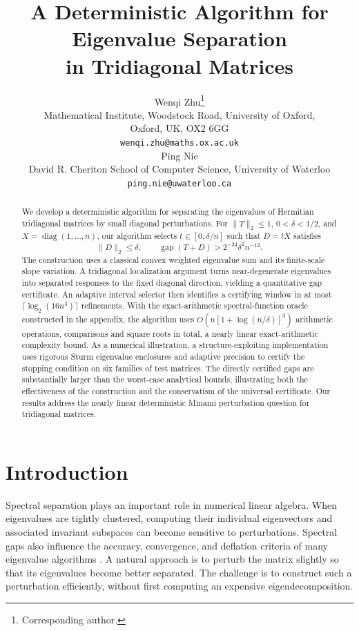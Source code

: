 \documentclass[10pt,a4paper]{article}
\title{A Deterministic Algorithm for Eigenvalue Separation\\in Tridiagonal Matrices}
\author{%
Wenqi Zhu\thanks{Corresponding author.}\\
{\small Mathematical Institute, Woodstock Road, University of Oxford,}\\
{\small Oxford, UK, OX2 6GG}\\
{\small\texttt{wenqi.zhu@maths.ox.ac.uk}}\\[1ex]
Ping Nie\\
{\small David R. Cheriton School of Computer Science, University of Waterloo}\\
{\small\texttt{ping.nie@uwaterloo.ca}}}
\date{}
\DeclareMathOperator{\gap}{gap}
\DeclareMathOperator{\diag}{diag}
\begin{document}
\maketitle

\begin{abstract}
We develop a deterministic algorithm for separating the eigenvalues
of Hermitian tridiagonal matrices by small diagonal perturbations.
For $\|T\|_2\leq1$, $0<\delta<1/2$, and
$X=\diag(1,\ldots,n)$, our algorithm selects $t\in[0,\delta/n]$ such
that $D=tX$ satisfies
\[
\|D\|_2\leq\delta,
\qquad
\gap(T+D)>2^{-34}\delta^2n^{-12}.
\]
The construction uses a classical convex weighted eigenvalue sum and its
finite-scale slope variation. A tridiagonal localization argument turns
near-degenerate eigenvalues into separated responses to the fixed diagonal
direction, yielding a quantitative gap certificate. An adaptive interval
selector then identifies a certifying window in at most
$\lceil\log_2(16n^3)\rceil$ refinements. With the exact-arithmetic
spectral-function oracle constructed in the appendix, the algorithm
uses $O(n[1+\log(n/\delta)]^3)$ arithmetic operations, comparisons
and square roots in total, a nearly linear exact-arithmetic
complexity bound. As a numerical illustration, a structure-exploiting
implementation uses rigorous
Sturm eigenvalue enclosures and adaptive precision to certify the
stopping condition on six families of test matrices. The directly
certified gaps are substantially larger than the worst-case analytical
bounds, illustrating both the effectiveness of the construction and the
conservatism of the universal certificate. Our results address the
nearly linear deterministic Minami perturbation question for
tridiagonal matrices.
\end{abstract}


\section{Introduction}
\label{sec:problem}

Spectral separation plays an important role in numerical linear
algebra. When eigenvalues are tightly clustered, computing their
individual eigenvectors and associated invariant subspaces can
become sensitive to perturbations. Spectral gaps also influence
the accuracy, convergence, and deflation criteria of many
eigenvalue algorithms \cite{Parlett1996,Nakatsukasa2012,
HorningTownsend2020}. A natural approach is to perturb the
matrix slightly so that its eigenvalues become better separated.
The challenge is to construct such a perturbation efficiently,
without first computing an expensive eigendecomposition.
\end{document}
